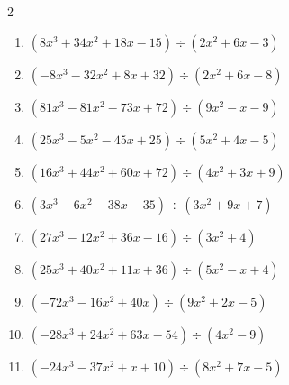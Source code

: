 \begin{multicols}{2}
\begin{enumerate}
  \item $(8x^{3}+34x^{2}+18x-15) \div (2x^{2}+6x-3)$

        \phantom{$商 : 4x+5, \quad 剰余 : 3$}

  \item $(-8x^{3}-32x^{2}+8x+32) \div (2x^{2}+6x-8)$

        \phantom{$商 : -4x-4, \quad 剰余 : 2x+8$}

  \item $(81x^{3}-81x^{2}-73x+72) \div (9x^{2}-x-9)$

        \phantom{$商 : 9x-8, \quad 剰余 : -3x+9$}

\columnbreak %

  \item $(25x^{3}-5x^{2}-45x+25) \div (5x^{2}+4x-5)$

        \phantom{$商 : 5x-5, \quad 剰余 : 2x+8$}

  \item $(16x^{3}+44x^{2}+60x+72) \div (4x^{2}+3x+9)$

        \phantom{$商 : 4x+8, \quad 剰余 : 6x-2$}

  \item $(3x^{3}-6x^{2}-38x-35) \div (3x^{2}+9x+7)$

        \phantom{$商 : x-5, \quad 剰余 : 4x+9$}

  \item $(27x^{3}-12x^{2}+36x-16) \div (3x^{2}+4)$

        \phantom{$商 : 9x-4, \quad 剰余 : 5x+3$}

  \item $(25x^{3}+40x^{2}+11x+36) \div (5x^{2}-x+4)$

        \phantom{$商 : 5x+9, \quad 剰余 : 5x-8$}

\columnbreak %

\resetques

  \item $(-72x^{3}-16x^{2}+40x) \div (9x^{2}+2x-5)$

        \phantom{$商 : -8x, \quad 剰余 : -5x+2$}

  \item $(-28x^{3}+24x^{2}+63x-54) \div (4x^{2}-9)$

        \phantom{$商 : -7x+6, \quad 剰余 : -7$}

  \item $(-24x^{3}-37x^{2}+x+10) \div (8x^{2}+7x-5)$

        \phantom{$商 : -3x-2, \quad 剰余 : -5x-5$}


\end{enumerate}
\end{multicols}
